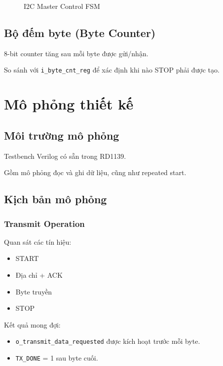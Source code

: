 \begin{figure}[H]
    \centering
    \caption{I2C Master Control FSM}
    \label{fig:master_fsm}
\end{figure}

\subsection{Bộ đếm byte (Byte Counter)}
8-bit counter tăng sau mỗi byte được gửi/nhận.

So sánh với \texttt{i\_byte\_cnt\_reg} để xác định khi nào STOP phải được tạo.

\section{Mô phỏng thiết kế}

\subsection{Môi trường mô phỏng}
Testbench Verilog có sẵn trong RD1139.

Gồm mô phỏng đọc và ghi dữ liệu, cũng như repeated start.

\subsection{Kịch bản mô phỏng}

\subsubsection{Transmit Operation}
Quan sát các tín hiệu:
\begin{itemize}[leftmargin=1.2cm]
    \item START
    \item Địa chỉ + ACK
    \item Byte truyền
    \item STOP
\end{itemize}

Kết quả mong đợi:
\begin{itemize}[leftmargin=1.2cm]
    \item \texttt{o\_transmit\_data\_requested} được kích hoạt trước mỗi byte.
    \item \texttt{TX\_DONE} = 1 sau byte cuối.
\end{itemize}

